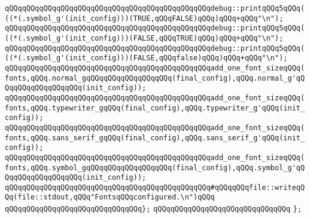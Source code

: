 \verb|qQQqqQQqqQQqqQQqqQQqqQQqqQQqqQQqqQQqqQQqqQQqqQQqdebug::printqQQq5qQQq(((*(.symbol_g'(init_config)))(TRUE,qQQqFALSE)qQQq)qQQq+qQQq"\n");|\newline
\verb|qQQqqQQqqQQqqQQqqQQqqQQqqQQqqQQqqQQqqQQqqQQqqQQqdebug::printqQQq5qQQq(((*(.symbol_g'(init_config)))(FALSE,qQQqTRUE)qQQq)qQQq+qQQq"\n");|\newline
\verb|qQQqqQQqqQQqqQQqqQQqqQQqqQQqqQQqqQQqqQQqqQQqqQQqdebug::printqQQq5qQQq(((*(.symbol_g'(init_config)))(FALSE,qQQqfalse)qQQq)qQQq+qQQq"\n");|\newline
\newline
\verb|qQQqqQQqqQQqqQQqqQQqqQQqqQQqqQQqqQQqqQQqqQQqqQQqadd_one_font_sizeqQQq(fonts,qQQq.normal_gqQQqqQQqqQQqqQQqqQQq(final_config),qQQq.normal_g'qQQqqQQqqQQqqQQqqQQq(init_config));|\newline
\verb|qQQqqQQqqQQqqQQqqQQqqQQqqQQqqQQqqQQqqQQqqQQqqQQqadd_one_font_sizeqQQq(fonts,qQQq.typewriter_gqQQq(final_config),qQQq.typewriter_g'qQQq(init_config));|\newline
\verb|qQQqqQQqqQQqqQQqqQQqqQQqqQQqqQQqqQQqqQQqqQQqqQQqadd_one_font_sizeqQQq(fonts,qQQq.sans_serif_gqQQq(final_config),qQQq.sans_serif_g'qQQq(init_config));|\newline
\verb|qQQqqQQqqQQqqQQqqQQqqQQqqQQqqQQqqQQqqQQqqQQqqQQqadd_one_font_sizeqQQq(fonts,qQQq.symbol_gqQQqqQQqqQQqqQQqqQQq(final_config),qQQq.symbol_g'qQQqqQQqqQQqqQQqqQQq(init_config));|\newline
\newline
\verb|qQQqqQQqqQQqqQQqqQQqqQQqqQQqqQQqqQQqqQQqqQQqqQQq#qQQqqQQqfile::writeqQQq(file::stdout,qQQq"FontsqQQqconfigured.\n")qQQq|\newline
\newline
\verb|qQQqqQQqqQQqqQQqqQQqqQQqqQQqqQQq};|\newline
\verb|qQQqqQQqqQQqqQQqqQQqqQQqqQQqqQQq|\newline
\verb|};|\newline
\newline
\newline

